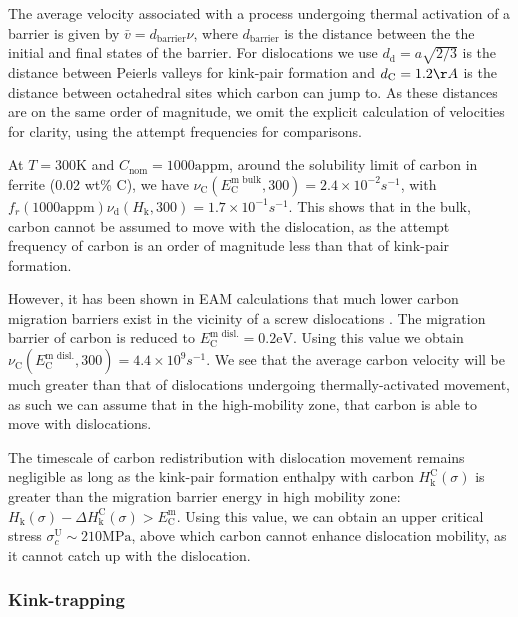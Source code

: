 \documentclass[a4paper,11pt]{article}
\begin{document}
The average velocity associated with a process undergoing thermal activation of a
barrier is given by \(\bar{v} = d_{\text{barrier}}\nu\), where \(d_{\text{barrier}}\) is
the distance between the the initial and final states of the barrier. For dislocations
we use \(d_{\text{d}} = a\sqrt{2/3}\) is the distance between Peierls valleys for
kink-pair formation and \(d_{\text{C}} = 1.2\AA\) is the distance between octahedral
sites which carbon can jump to. As these distances are on the same order of magnitude,
we omit the explicit calculation of velocities for clarity, using the attempt frequencies for comparisons.

At \(T=300 \text{K}\) and \(C_{\text{nom}} = 1000 \text{appm}\), around the solubility
limit of carbon in ferrite (0.02 wt\% C), we have \(\nu_{\text{C}}(E^{\text{m
   bulk}}_{\text{C}},300) = 2.4\times 10^{-2} s^{-1}\), with \(f_r(1000
   \text{appm})\nu_{\text{d}}(H_{\text{k}},300) = 1.7 \times 10^{-1} s^{-1}\). This shows
that in the bulk, carbon cannot be assumed to move with the dislocation, as the
attempt frequency of carbon is an order of magnitude less than that of kink-pair
formation.

However, it has been shown in EAM calculations that much lower carbon migration
barriers exist in the vicinity of a screw dislocations \cite{Nematollahi2016}. The
migration barrier of carbon is reduced to \(E^{\text{m disl.}}_{\text{C}} = 0.2
   \text{eV}\). Using this value we obtain \(\nu_{\text{C}}(E^{\text{m
   disl.}}_{\text{C}}, 300) = 4.4 \times 10^{9} s^{-1}\). We see that the average carbon velocity
will be much greater than that of dislocations undergoing thermally-activated movement, as
such we can assume that in the high-mobility zone, that carbon is able to move with
dislocations.


The timescale of carbon redistribution with dislocation movement remains negligible as
long as the kink-pair formation enthalpy with carbon \(H_{\text{k}}^{\text{C}}(\sigma)\)
is greater than the migration barrier energy in high mobility zone:
\(H_{\text{k}}(\sigma) - \Delta H_{\text{k}}^{\text{C}}(\sigma) >
   E^{\text{m}}_{\text{C}}\). Using this value, we can obtain an upper critical stress
\(\sigma^{\text{U}}_c \sim 210 \text{MPa}\), above which carbon cannot enhance
dislocation mobility, as it cannot catch up with the dislocation.

\subsubsection{Kink-trapping}
\label{sec:org38921d9}
\end{document}
